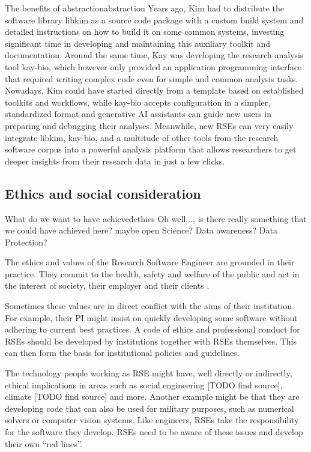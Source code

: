 \documentclass{eceasst}
\begin{document}
\begin{story}{The benefits of abstraction}{abstraction}
Years ago, Kim had to distribute the software library libkim as a source code package with a custom build system and detailed instructions on how to build it on some common systems,
investing significant time in developing and maintaining this auxiliary toolkit and documentation.
Around the same time, Kay was developing the research analysis tool kay-bio,
which however only provided an application programming interface that
required writing complex code even for simple and common analysis tasks.
Nowadays, Kim could have started directly from a template based on established toolkits and workflows,
while kay-bio accepts configuration in a simpler, standardized format and generative AI assistants
can guide new users in preparing and debugging their analyses.
Meanwhile, new RSEs can very easily integrate libkim, kay-bio, and a multitude
of other tools from the research software corpus into a powerful analysis
platform that allows researchers to get deeper insights from their research data
in just a few clicks.
\end{story}

\subsection{Ethics and social consideration}
\begin{whatis}{What do we want to have achieved}{ethics}
Oh well..., is there really something that we could have achieved here?
maybe open Science? Data awareness? Data Protection?
\end{whatis}

The ethics and values of the Research Software Engineer are grounded in their practice.
They commit to the health, safety and welfare of the public and act in the interest of society, their employer and their clients \cite{Goth2023}.

Sometimes these values are in direct conflict with the aims of their institution. For example, their PI might insist on quickly developing some software without adhering to current best practices.
A code of ethics and professional conduct for RSEs should be developed by institutions together with RSEs themselves. This can then form the basis for institutional policies and guidelines.

The technology people working as RSE might have, well directly or indirectly, ethical implications in areas such as social engineering [TODO find source], climate [TODO find source] and more.
Another example might be that they are developing code that can also be used for military purposes, such as numerical solvers or computer vision systems.
Like engineers, RSEs take the responsibility for the software they develop.
RSEs need to be aware of these issues and develop their own ``red lines''.
\end{document}
